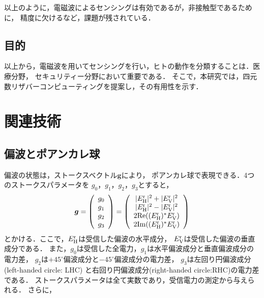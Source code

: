 \documentclass[uplatex,a4paper,10pt]{jsarticle}
\begin{document}
以上のように，電磁波によるセンシングは有効であるが，非接触型であるために，
精度に欠けるなど，課題が残されている．

\subsection{目的}
以上から，電磁波を用いてセンシングを行い，ヒトの動作を分類することは．医療分野，
セキュリティー分野において重要である．
そこで，本研究では，四元数リザバーコンピューティングを提案し，その有用性を示す．

\section{関連技術}
\subsection{偏波とポアンカレ球}
偏波の状態は，ストークスベクトル$\bm{g}$により，
ポアンカレ球で表現できる．4つのストークスパラメータを
$g_0，g_1，g_2，g_3$とすると，
\begin{align}
    \bm{g} = 
      \left(
        \begin{array}{c}
            g_0 \\
            g_1 \\
            g_2 \\
            g_3
        \end{array}
      \right)
    = \left(
        \begin{array}{c}
            |E_{\rm{H}}^{\rm{r}}|^2 + |E_{\rm{V}}^{\rm{r}}|^2 \\
            |E_{\rm{H}}^{\rm{r}}|^2 - |E_{\rm{V}}^{\rm{r}}|^2 \\
            2\mathrm{Re}((E_{\rm{H}}^{\rm{r}})^*E_{\rm{V}}^{\rm{r}}) \\
            2\mathrm{Im}((E_{\rm{H}}^{\rm{r}})^*E_{\rm{V}}^{\rm{r}})
        \end{array}
      \right)
\end{align}
とかける．ここで，$E_{\rm{H}}^{\rm{r}}$は受信した偏波の水平成分，
$E_{\rm{V}}^{\rm{r}}$は受信した偏波の垂直成分である．
また，$g_0$は受信した全電力，$g_1$は水平偏波成分と垂直偏波成分の電力差，
$g_2$は$+45^\circ$偏波成分と$-45^\circ$偏波成分の電力差，
$g_3$は左回り円偏波成分(left-handed circle: LHC)
と右回り円偏波成分(right-handed circle:RHC)の電力差である．
ストークスパラメータは全て実数であり，受信電力の測定から与えられる．
さらに，
\end{document}
